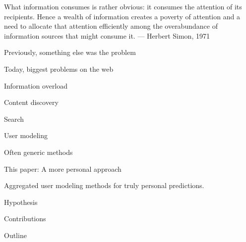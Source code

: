 \begin{blockquote}
  \center
  What information consumes is rather obvious: it consumes the attention of its recipients. Hence a wealth of information creates a poverty
  of attention and a need to allocate that attention efficiently among the overabundance of information sources that might consume it.
  --- Herbert Simon, 1971 \cite{Greenberger1971} 
\end{blockquote}
\vspace{2em}







Previously, something else was the problem

Today, biggest problems on the web

Information overload

Content discovery

Search

User modeling

Often generic methods

This paper: A more personal approach

Aggregated user modeling methods for 
truly personal predictions.

Hypothesis

Contributions

Outline


